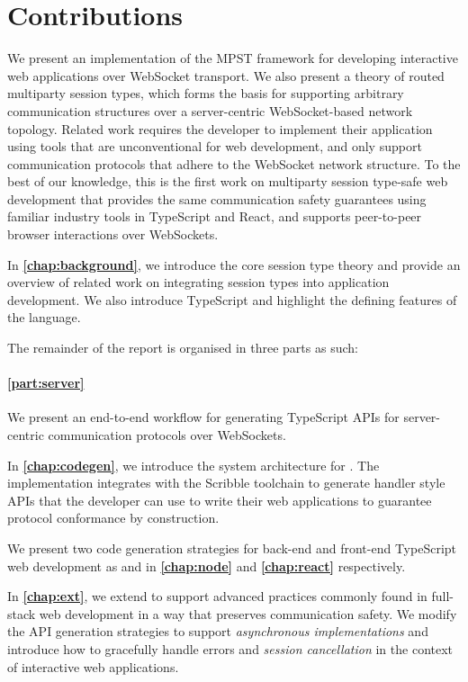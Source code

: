 \section{Contributions}

We present an implementation of the MPST framework for developing
interactive web applications over WebSocket transport.
We also present a theory of routed multiparty session types,
which forms the basis for supporting arbitrary communication structures
over a server-centric WebSocket-based network topology.
Related work \citep{PureScript2019, MVU2020, LINKS, Exceptional} 
requires the 
developer to implement their application using tools that are 
unconventional for web development, 
and only support communication protocols that adhere to the
WebSocket network structure.
To the best of our knowledge, this is the first work on multiparty session
type-safe web development that provides the same communication safety 
guarantees using familiar industry tools in TypeScript and React,
and supports peer-to-peer browser interactions over WebSockets.

In \textbf{\cref{chap:background}}, 
we introduce the core session type theory
and provide an overview of related work on integrating session types into
application development. We also introduce TypeScript and highlight the 
defining features of the language.

The remainder of the report is organised in three parts as such:

\paragraph{\cref{part:server}}
We present an end-to-end workflow for generating TypeScript APIs for 
server-centric communication protocols over WebSockets. 

In \textbf{\cref{chap:codegen}}, 
we introduce the system architecture for
\codegen. 
The implementation integrates with the Scribble
toolchain to generate handler style APIs that the developer can use to write 
their web applications to guarantee protocol conformance by construction.

We present two code generation strategies for back-end and front-end
TypeScript web development as \nodecodegen and \reactcodegen
in \textbf{\cref{chap:node}} and \textbf{\cref{chap:react}} respectively.

In \textbf{\cref{chap:ext}},
we extend \codegen to support advanced
practices commonly found in full-stack web development in a way that
preserves communication safety. 
We modify the API generation strategies
to support \textit{asynchronous implementations} 
and introduce how to 
gracefully handle errors and \textit{session cancellation} 
in the context of interactive web applications.

